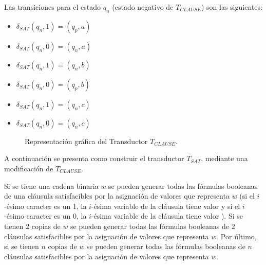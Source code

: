 Las transiciones para el estado $q_n$ (estado negativo de $T_{CLAUSE}$) son las siguientes:
\begin{multicols}{2}
    \begin{itemize}
        \item $\delta_{SAT}(q_{n},1)=(q_{p},a)$
        \item $\delta_{SAT}(q_{n},0)=(q_{n},a)$
        \item $\delta_{SAT}(q_{n},1)=(q_{n},b)$
        \item $\delta_{SAT}(q_{n},0)=(q_{p},b)$
        \item $\delta_{SAT}(q_{n},1)=(q_{n},c)$
        \item $\delta_{SAT}(q_{n},0)=(q_{n},c)$
    \end{itemize}
\end{multicols}

\begin{figure}[h]
    \centering  \begin{otherlanguage}{english}
    \end{otherlanguage}
    \caption{Representación gráfica del Transductor $T_{CLAUSE}$.}
    \label{fig:transducer_clause} %
\end{figure}

A continuación se presenta como construir el transductor $T_{SAT}$, mediante una modificación de $T_{CLAUSE}$.

Si se tiene una cadena binaria $w$ se pueden generar todas las fórmulas booleanas de una cláusula 
satisfacibles por la asignación de valores que representa $w$ (si el $i$-ésimo caracter es un 1, la 
$i$-ésima variable de la cláusula tiene valor \true{} y si el $i$-ésimo caracter es un 0, la $i$-ésima 
variable de la cláusula tiene valor \false{}). Si se tienen 2 copias de $w$ se pueden generar todas las fórmulas 
booleanas de 2 cláusulas satisfacibles por la asignación de valores que representa $w$. 
Por último, si se tienen $n$ copias de $w$ se pueden generar todas las fórmulas booleanas de $n$ cláusulas satisfacibles por la asignación de valores que representa $w$.

